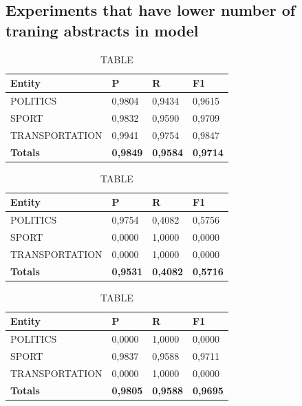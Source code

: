 \documentclass[thesis=M,english]{FITthesis}[2018/05/30]
\begin{document}

\subsection{Experiments that have lower number of traning abstracts in model}

	\begin{table}[H]\centering
		\caption{TABLE}
		\label{}
		\begin{tabular}{|l|l|l|l|}
			\hline {\textbf{Entity}} & {\textbf{P}} & {\textbf{R}} & {\textbf{F1}}\\\hline
				POLITICS & 0,9804 & 0,9434 & 0,9615\\
				SPORT & 0,9832 & 0,9590 & 0,9709\\
				TRANSPORTATION & 0,9941 & 0,9754 & 0,9847\\\hline
				\textbf{Totals} & \textbf{0,9849} & \textbf{0,9584} & \textbf{0,9714}\\\hline
		\end{tabular}
	\end{table}

	\begin{table}[H]\centering
		\caption{TABLE}
		\label{}
		\begin{tabular}{|l|l|l|l|}
			\hline {\textbf{Entity}} & {\textbf{P}} & {\textbf{R}} & {\textbf{F1}}\\\hline
				POLITICS & 0,9754 & 0,4082 & 0,5756\\
				SPORT & 0,0000 & 1,0000 & 0,0000\\
				TRANSPORTATION & 0,0000 & 1,0000 & 0,0000\\\hline
				\textbf{Totals} & \textbf{0,9531} & \textbf{0,4082} & \textbf{0,5716}\\\hline
		\end{tabular}
	\end{table}

	\begin{table}[H]\centering
		\caption{TABLE}
		\label{}
		\begin{tabular}{|l|l|l|l|}
			\hline {\textbf{Entity}} & {\textbf{P}} & {\textbf{R}} & {\textbf{F1}}\\\hline
				POLITICS & 0,0000 & 1,0000 & 0,0000\\
				SPORT & 0,9837 & 0,9588 & 0,9711\\
				TRANSPORTATION & 0,0000 & 1,0000 & 0,0000\\\hline
				\textbf{Totals} & \textbf{0,9805} & \textbf{0,9588} & \textbf{0,9695}\\\hline
		\end{tabular}
	\end{table}	
\end{document}
